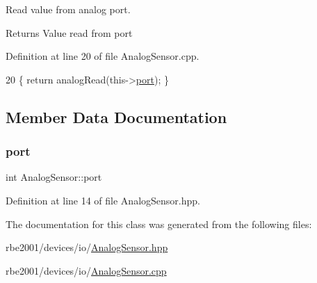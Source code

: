 Read value from analog port. 

\begin{DoxyReturn}{Returns}
Value read from port 
\end{DoxyReturn}


Definition at line 20 of file Analog\+Sensor.\+cpp.


\begin{DoxyCode}
20 \{ \textcolor{keywordflow}{return} analogRead(this->\hyperlink{class_analog_sensor_a4897b9d41db1368ecc600a43547580f7}{port}); \}
\end{DoxyCode}


\subsection{Member Data Documentation}
\mbox{\label{class_analog_sensor_a4897b9d41db1368ecc600a43547580f7}} 
\subsubsection{\texorpdfstring{port}{port}}
{\footnotesize\ttfamily int Analog\+Sensor\+::port\hspace{0.3cm}{\ttfamily [private]}}



Definition at line 14 of file Analog\+Sensor.\+hpp.



The documentation for this class was generated from the following files\+:\begin{DoxyCompactItemize}
\item 
rbe2001/devices/io/\hyperlink{_analog_sensor_8hpp}{Analog\+Sensor.\+hpp}\item 
rbe2001/devices/io/\hyperlink{_analog_sensor_8cpp}{Analog\+Sensor.\+cpp}\end{DoxyCompactItemize}
